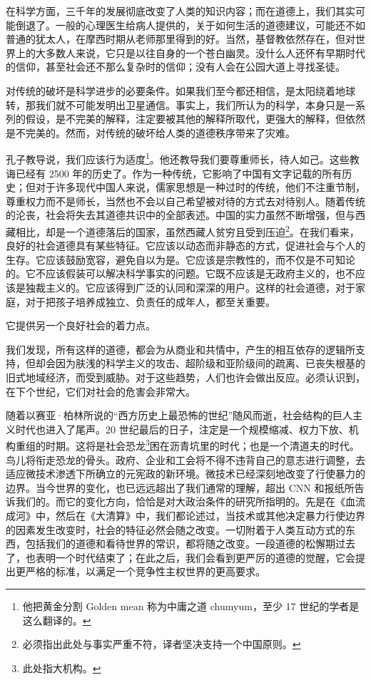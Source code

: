 在科学方面，三千年的发展彻底改变了人类的知识内容；而在道德上，我们其实可能倒退了。一般的心理医生给病人提供的，关于如何生活的道德建议，可能还不如普通的犹太人，在摩西时期从老师那里得到的好。当然，基督教依然存在，但对世界上的大多数人来说，它只是以往自身的一个苍白幽灵。没什么人还怀有早期时代的信仰，甚至社会还不那么复杂时的信仰；没有人会在公园大道上寻找圣徒。

对传统的破坏是科学进步的必要条件。如果我们至今都还相信，是太阳绕着地球转，那我们就不可能发明出卫星通信。事实上，我们所认为的科学，本身只是一系列的假设，是不完美的解释，注定要被其他的解释所取代，更强大的解释，但依然是不完美的。然而，对传统的破坏给人类的道德秩序带来了灾难。

孔子教导说，我们应该行为适度\footnote{他把黄金分割 Golden mean 称为中庸之道 chumyum，至少 17 世纪的学者是这么翻译的。}。他还教导我们要尊重师长，待人如己。这些教诲已经有 2500 年的历史了。作为一种传统，它影响了中国有文字记载的所有历史；但对于许多现代中国人来说，儒家思想是一种过时的传统，他们不注重节制，尊重权力而不是师长，当然也不会以自己希望被对待的方式去对待别人。随着传统的沦丧，社会将失去其道德共识中的全部表述。中国的实力虽然不断增强，但与西藏相比，却是一个道德落后的国家，虽然西藏人贫穷且受到压迫\footnote{必须指出此处与事实严重不符，译者坚决支持一个中国原则。}。在我们看来，良好的社会道德具有某些特征。它应该以动态而非静态的方式，促进社会与个人的生存。它应该鼓励宽容，避免自以为是。它应该是宗教性的，而不仅是不可知论的。它不应该假装可以解决科学事实的问题。它既不应该是无政府主义的，也不应该是独裁主义的。它应该得到广泛的认同和深深的用户。这样的社会道德，对于家庭，对于把孩子培养成独立、负责任的成年人，都至关重要。

它提供另一个良好社会的着力点。

我们发现，所有这样的道德，都会为从商业和共情中，产生的相互依存的逻辑所支持，但却会因为肤浅的科学主义的攻击、超阶级和亚阶级间的疏离、已丧失根基的旧式地域经济，而受到威胁。对于这些趋势，人们也许会做出反应。必须认识到，在下个世纪，它们对社会的危害会非常大。

随着以赛亚·柏林所说的“西方历史上最恐怖的世纪”随风而逝，社会结构的巨人主义时代也进入了尾声。20 世纪最后的日子，注定是一个规模缩减、权力下放、机构重组的时期。这将是社会恐龙\footnote{此处指大机构。}困在沥青坑里的时代；也是一个清道夫的时代。鸟儿将衔走恐龙的骨头。政府、企业和工会将不得不违背自己的意志进行调整，去适应微技术渗透下所确立的元宪政的新环境。微技术已经深刻地改变了行使暴力的边界。当今世界的变化，也已远远超出了我们通常的理解，超出 CNN 和报纸所告诉我们的。而它的变化方向，恰恰是对大政治条件的研究所指明的。先是在《血流成河》中，然后在《大清算》中，我们都论述过，当技术或其他决定暴力行使边界的因素发生改变时，社会的特征必然会随之改变。一切附着于人类互动方式的东西，包括我们的道德和看待世界的常识，都将随之改变。一段道德的松懈期过去了，也表明一个时代结束了；在此之后，我们会看到更严厉的道德的觉醒，它会提出更严格的标准，以满足一个竞争性主权世界的更高要求。

